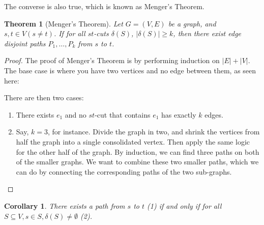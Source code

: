 \documentclass[]{article}
\newtheorem*{theorem}{Theorem}
\newtheorem*{corollary}{Corollary}
\theoremstyle{definition}
\newcommand{\lecture}[1]{\marginpar{{\footnotesize $\leftarrow$ \underline{#1}}}}
\begin{document}
				The converse is also true, which is known as Menger's Theorem.
			
				\begin{theorem}[Menger's Theorem]
					Let $G = (V, E)$ be a graph, and $s, t \in V (s \ne t)$. If for all $st$-cuts $\delta(S)$, $|\delta(S)| \ge k$, then there exist edge disjoint paths $P_1, \ldots, P_k$ from $s$ to $t$.
				\end{theorem}
			
				\begin{proof}
					The proof of Menger's Theorem is by performing induction on $|E| + |V|$. The base case is where you have two vertices and no edge between them, as seen here:
					\begin{center}
					\end{center}
				
					There are then two cases:
					\begin{enumerate}
						\item There exists $e_1$ and no $st$-cut that contains $e_1$ has exactly $k$ edges.
						\item Say, $k = 3$, for instance. Divide the graph in two, and shrink the vertices from half the graph into a single consolidated vertex. Then apply the same logic for the other half of the graph. By induction, we can find three paths on both of the smaller graphs. We want to combine these two smaller paths, which we can do by connecting the corresponding paths of the two sub-graphs.
					\end{enumerate}
				\end{proof}

				\begin{corollary} \lecture{March 4, 2013}
					There exists a path from $s$ to $t$ (1) if and only if for all $S \subseteq V, s \in S, \delta(S) \ne \emptyset$ (2).
				\end{corollary}
\end{document}
